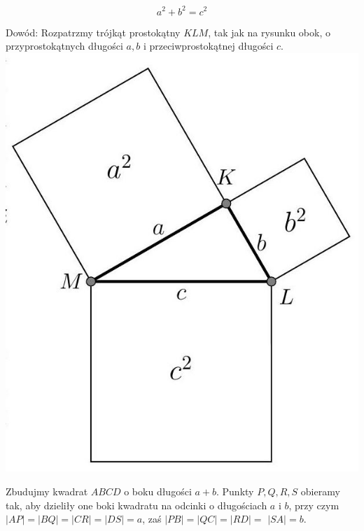 \documentclass[10pt]{article}
\begin{document}
\[
a^{2}+b^{2}=c^{2}
\]

Dowód: Rozpatrzmy trójkąt prostokątny \(K L M\), tak jak na rysunku obok, o przyprostokątnych długości \(a, b\) i przeciwprostokątnej długości \(c\).\\
\includegraphics[max width=\textwidth, center]{2024_11_21_71f62bd117d375398909g-121}

Zbudujmy kwadrat \(A B C D\) o boku długości \(a+b\). Punkty \(P, Q, R, S\) obieramy tak, aby dzieliły one boki kwadratu na odcinki o długościach \(a\) i \(b\), przy czym \(|A P|=|B Q|=|C R|=|D S|=a\), zaś \(|P B|=|Q C|=|R D|=\) \(|S A|=b\).
\end{document}
